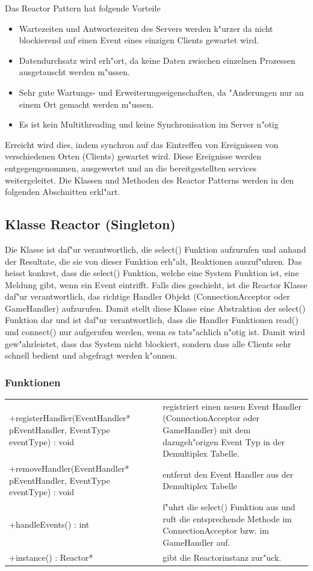 Das Reactor Pattern hat folgende Vorteile
\begin{itemize}
	\item Wartezeiten und Antwortezeiten des Servers werden k"urzer da nicht blockierend auf einen Event eines einzigen Clients gewartet wird.
	\item Datendurchsatz wird erh"ort, da keine Daten zwischen einzelnen Prozessen ausgetauscht werden m"ussen.
	\item Sehr gute Wartungs- und Erweiterungseigenschaften, da "Anderungen nur an einem Ort gemacht werden m"ussen.
	\item Es ist kein Multithreading und keine Synchronisation im Server n"otig
\end{itemize}

Erreicht wird dies, indem synchron auf das Eintreffen von Ereignissen von verschiedenen Orten (Clients) gewartet wird. Diese Ereignisse
werden entgegengenommen, ausgewertet und an die bereitgestellten services weitergeleitet. Die Klassen und Methoden des Reactor 
Patterns werden in den folgenden Abschnitten erkl"art.
	
	
\subsection{Klasse Reactor (Singleton)}
Die Klasse ist daf"ur verantwortlich, die select() Funktion aufzurufen und anhand der Resultate, die sie von dieser Funktion erh"alt,
Reaktionen auszuf"uhren. Das heisst konkret, dass die select() Funktion, welche eine System Funktion ist, eine Meldung gibt, wenn ein 
Event eintrifft. Falls dies geschieht, ist die Reactor Klasse daf"ur verantwortlich, das richtige Handler Objekt (ConnectionAcceptor oder
GameHandler) aufzurufen. Damit stellt diese Klasse eine Abstraktion der select() Funktion dar und ist daf"ur verantwortlich, dass die
Handler Funktionen read() und connect() nur aufgerufen werden, wenn es tats"achlich n"otig ist. Damit wird gew"ahrleistet, dass
das System nicht blockiert, sondern dass alle Clients sehr schnell bedient und abgefragt werden k"onnen.
\subsubsection{Funktionen}
\begin{tabular}{p{50mm}p{90mm}}
	+registerHandler(EventHandler* pEventHandler, EventType eventType) : void  &  registriert einen neuen Event Handler (ConnectionAcceptor
	oder GameHandler) mit dem dazugeh"origen Event Typ in der Demultiplex Tabelle. \\
	+removeHandler(EventHandler* pEventHandler, EventType eventType)  : void  &  entfernt den Event Handler aus der Demultiplex Tabelle \\
	+handleEvents() : int     & f"uhrt die select() Funktion aus und ruft die 
	entsprechende Methode im ConnectionAcceptor bzw. im GameHandler auf. \\
	+instance() : Reactor* & gibt die Reactorinstanz zur"uck. \\ 
\end{tabular}


